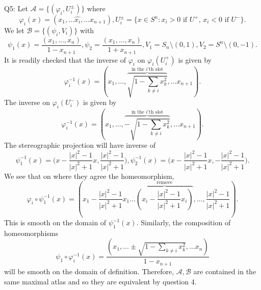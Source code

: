 \documentclass[letterpaper]{article}
\begin{document}
 \noindent Q5: Let $\mathcal{A} = \{(\varphi_i , U^{\pm}_i)\}$ where 
$$\varphi_i(x) = (x_1, \dots \hat{x_i}, \dots x_{n+1}), U_i^{\pm} = \{x\in S^n: x_i >0 \text{ if $U^+$, } x_i<0 \text{ if $U^-$} \}. $$ We let $\mathcal{B} =\{(\psi_i, V_i)\}$ with 
$$\psi_1(x) = \frac{(x_1, \dots, x_{n})}{1-x_{n+1}}, \psi_2 = \frac{(x_1, \dots, x_{n})}{1+x_{n+1}}, V_1 = S_{n} \setminus{(0,1)}, V_2 = S^n \setminus{(0,-1)}.$$
It is readily checked that the inverse of $\varphi_i$ on $\varphi_i(U_i^+)$ is given by $$\varphi_i^{-1}(x) = (x_1, \dots , \overbrace{\sqrt{1-\sum_{k\neq i}x_k^2 }}^{\text{in the $i$'th slot}}, \dots x_{n+1}).$$ 
The inverse on $\varphi_i(U_i^-)$  is given by $$\varphi_i^{-1}(x)= (x_1, \dots , \overbrace{-\sqrt{1-\sum_{k\neq i}x_k^2 }}^{\text{in the $i$'th slot}}, \dots x_{n+1}).$$ 
The stereographic projection will have inverse of $$\psi_1^{-1}(x) = \Big(x - \frac{|x|^2-1}{|x|^2+1}x, \frac{|x|^2-1}{|x|^2+1} \Big) , \psi_2^{-1}(x) = \Big(x - \frac{|x|^2-1}{|x|^2+1}x, - \frac{|x|^2-1}{|x|^2+1} \Big).$$
We see that on where they agree the homeomorphism, $$\varphi_i \circ \psi_1^{-1}(x) =( x_1 - \frac{|x|^2 -1}{|x|^2+1}x_1 \dots \overbrace{(x_i - \frac{|x|^2 -1}{|x|^2+1} x_i)}^{\text{remove}}, \dots, \frac{|x|^2 -1}{|x|^2+1} ).$$
This is smooth on the domain of $\psi_1^{-1}(x)$. Similarly, the composition of homeomorphisms $$\psi_1\circ \varphi_i^{-1}(x) = \frac{(x_1, \dots \pm \sqrt{1-\sum_{k\neq i}x_k^2 } , \dots x_n)}{1- x_{n+1}}$$ will be smooth on the domain of definition. 
Therefore, $\mathcal{A}, \mathcal{B}$ are contained in the same maximal atlas and so they are equivalent by question 4.
\end{document}
